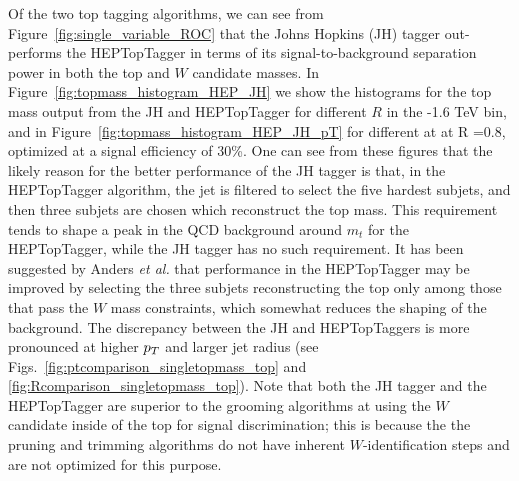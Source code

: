 Of the two top tagging algorithms, we can see from Figure~\ref{fig:single_variable_ROC} that the Johns Hopkins (JH) tagger out-performs the HEPTopTagger in terms of its signal-to-background separation power in both the top and $W$ candidate masses. In Figure~\ref{fig:topmass_histogram_HEP_JH} we show the histograms for the top mass output from the JH and HEPTopTagger for different $R$ in the -1.6 TeV bin, and in Figure~\ref{fig:topmass_histogram_HEP_JH_pT} for different \pt at at R =0.8, optimized at a signal efficiency of 30\%. One can see from these figures that the likely reason for the better performance of the JH tagger is that, in the HEPTopTagger algorithm, the jet is filtered to select the five hardest subjets, and then three subjets are chosen which reconstruct the top mass. This requirement tends to shape a peak in the QCD background around $m_t$ for the HEPTopTagger, while the JH tagger has no such requirement. It has been suggested by Anders \emph{et al.} \cite{Anders:2013oga} that performance in the HEPTopTagger may be improved by selecting the three subjets reconstructing the top only among those that pass the $W$ mass constraints, which somewhat reduces the shaping of the background. The discrepancy between the JH and HEPTopTaggers is more pronounced  at higher $p_T$ and larger jet radius (see Figs.~\ref{fig:ptcomparison_singletopmass_top} and \ref{fig:Rcomparison_singletopmass_top}). Note that both the JH tagger and the HEPTopTagger are superior to the grooming algorithms at using the $W$ candidate inside of the top for signal discrimination; this is because the the pruning and trimming algorithms do not have inherent $W$-identification steps and are not optimized for this purpose.

